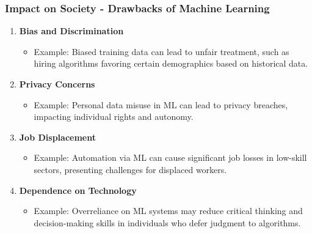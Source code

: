 \documentclass[aspectratio=169]{beamer}
\begin{document}
\begin{frame}[fragile]
    \frametitle{Impact on Society - Drawbacks of Machine Learning}
    \begin{enumerate}
        \item \textbf{Bias and Discrimination}
            \begin{itemize}
                \item Example: Biased training data can lead to unfair treatment, such as hiring algorithms favoring certain demographics based on historical data.
            \end{itemize}
        \item \textbf{Privacy Concerns}
            \begin{itemize}
                \item Example: Personal data misuse in ML can lead to privacy breaches, impacting individual rights and autonomy.
            \end{itemize}
        \item \textbf{Job Displacement}
            \begin{itemize}
                \item Example: Automation via ML can cause significant job losses in low-skill sectors, presenting challenges for displaced workers.
            \end{itemize}
        \item \textbf{Dependence on Technology}
            \begin{itemize}
                \item Example: Overreliance on ML systems may reduce critical thinking and decision-making skills in individuals who defer judgment to algorithms.
            \end{itemize}
    \end{enumerate}
\end{frame}
\end{document}
